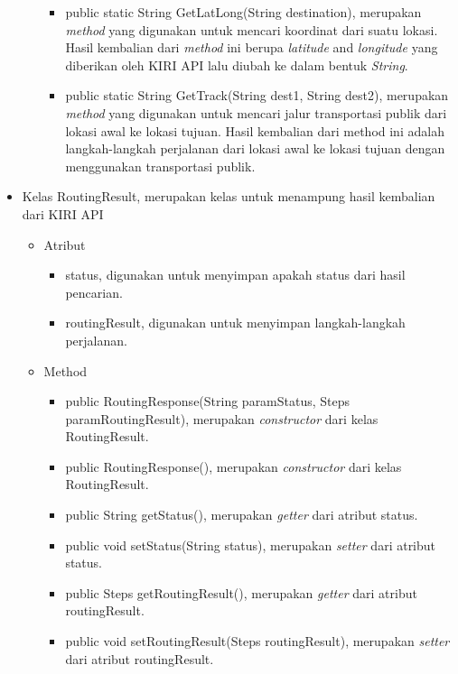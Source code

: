 \begin{itemize}
\begin{itemize}
							
									\begin{itemize}
												\item public static String GetLatLong(String destination), merupakan \textit{method} yang digunakan untuk mencari koordinat dari suatu lokasi. Hasil kembalian dari \textit{method} ini berupa \textit{latitude} and \textit{longitude} yang diberikan oleh KIRI API lalu diubah ke dalam bentuk \textit{String}.
												\item public static String GetTrack(String dest1, String dest2), merupakan \textit{method} yang digunakan untuk mencari jalur transportasi publik dari lokasi awal ke lokasi tujuan. Hasil kembalian dari method ini adalah langkah-langkah perjalanan dari lokasi awal ke lokasi tujuan dengan menggunakan transportasi publik.
									\end{itemize}
				\end{itemize}
		
		
		\item Kelas RoutingResult, merupakan kelas untuk menampung hasil kembalian dari KIRI API
		
		
				\begin{itemize}
							\item Atribut
					
					
									\begin{itemize}
												\item status, digunakan untuk menyimpan apakah status dari hasil pencarian.
												\item routingResult, digunakan untuk menyimpan langkah-langkah perjalanan.
									\end{itemize}
					
							\item Method
					
					
									\begin{itemize}
												\item public RoutingResponse(String paramStatus, Steps paramRoutingResult), merupakan \textit{constructor} dari kelas RoutingResult.
												\item public RoutingResponse(), merupakan \textit{constructor} dari kelas RoutingResult.
												\item public String getStatus(), merupakan \textit{getter} dari atribut status.
												\item public void setStatus(String status), merupakan \textit{setter} dari atribut status.
												\item public Steps getRoutingResult(), merupakan \textit{getter} dari atribut routingResult.
												\item public void setRoutingResult(Steps routingResult), merupakan \textit{setter} dari atribut routingResult.
									\end{itemize}
				\end{itemize}
		

\end{itemize}

